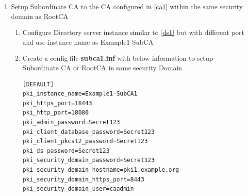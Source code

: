 \documentclass[12pt]{report}
\begin{document}
\begin{enumerate}[label*=\arabic*.]
\begin{enumerate}[label*=\arabic*.]
\begin{lstlisting}[style=configFile]
[slapd]
ServerIdentifier=pki-tomcat-RootCA
ServerPort=389
Suffix=dc=example,dc=org
RootDN=cn=Directory Manager
RootDNPwd=Secret123

[admin]
ServerAdminID=admin
ServerAdminPwd=Secret123
SysUser=nobody
                        \end{lstlisting}
                    \begin{lstlisting}[style=bashInputStyle]
$ setup-ds.pl --silent --file=ca-ds.inf --debug
                    \end{lstlisting}
                \item \label{ca1}Run \textbf{\textit{pkispawn}} in interactive mode use default ports and specify Directory
                    server information configured above. Use Tomcat Instance name as 'pki-tomcat'
                    \begin{lstlisting}
Subsystem (CA/KRA/OCSP/TKS/TPS) [CA]:

Tomcat:
  Instance [pki-tomcat]:
  HTTP port [8080]:
  Secure HTTP port [8443]:
  AJP port [8009]:
  Management port [8005]:

Administrator:
  Username [caadmin]:
  Password:
  Verify password:
  Import certificate (Yes/No) [N]?
  Export certificate to [/root/.dogtag/pki-tomcat/ca_admin.cert]:
Directory Server:
  Hostname [pki1.example.org]:
  Use a secure LDAPS connection (Yes/No/Quit) [N]?
  LDAP Port [389]:
  Bind DN [cn=Directory Manager]:
  Password:
  Base DN [o=pki-tomcat-CA]:

Security Domain:
  Name [example.org Security Domain]:

Begin installation (Yes/No/Quit)? Yes
                    \end{lstlisting}
            \end{enumerate}
        \item \label{ca2} Setup Subordinate CA to the CA configured in \ref{ca1} within the same security domain as RootCA
            \begin{enumerate}[label*=\arabic*.]
                \item Configure Directory server instance similar to \ref{ds1} but with different port and use instance name as Example1-SubCA
                \item Create a config file \textbf{subca1.inf} with below information to setup Subordinate CA or RootCA in same security Domain
                    \begin{lstlisting}[style=configFile]
[DEFAULT]
pki_instance_name=Example1-SubCA1
pki_https_port=18443
pki_http_port=18080
pki_admin_password=Secret123
pki_client_database_password=Secret123
pki_client_pkcs12_password=Secret123
pki_ds_password=Secret123
pki_security_domain_password=Secret123
pki_security_domain_hostname=pki1.example.org
pki_security_domain_https_port=8443
pki_security_domain_user=caadmin


\end{lstlisting}
\end{enumerate}
\end{enumerate}
\end{document}
